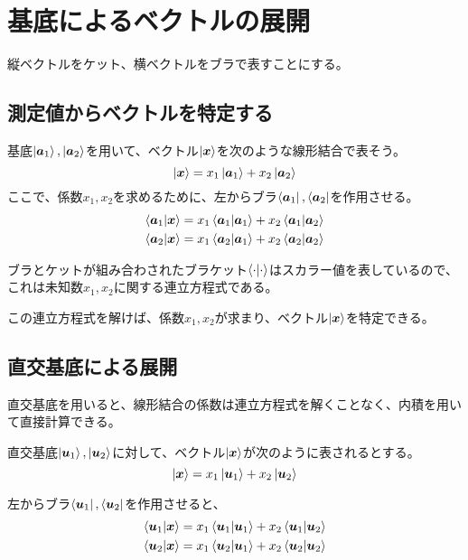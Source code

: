 \documentclass[../../../topic_linear-algebra]{subfiles}
\begin{document}
\sectionline
\section{基底によるベクトルの展開}

縦ベクトルをケット、横ベクトルをブラで表すことにする。

\subsection{測定値からベクトルを特定する}

基底$\ket{\vb*{a}_1}, \ket{\vb*{a}_2}$を用いて、ベクトル$\ket{\vb*{x}}$を次のような線形結合で表そう。
\begin{equation*}
  \ket{\vb*{x}} = x_1 \ket{\vb*{a}_1} + x_2 \ket{\vb*{a}_2}
\end{equation*}
ここで、係数$x_1, x_2$を求めるために、左からブラ$\bra{\vb*{a}_1}, \bra{\vb*{a}_2}$を作用させる。
\begin{align*}
  \braket{\vb*{a}_1|\vb*{x}} & = x_1 \braket{\vb*{a}_1|\vb*{a}_1} + x_2 \braket{\vb*{a}_1|\vb*{a}_2} \\
  \braket{\vb*{a}_2|\vb*{x}} & = x_1 \braket{\vb*{a}_2|\vb*{a}_1} + x_2 \braket{\vb*{a}_2|\vb*{a}_2} 
\end{align*}

ブラとケットが組み合わされたブラケット$\braket{\cdot|\cdot}$はスカラー値を表しているので、これは未知数$x_1, x_2$に関する連立方程式である。

この連立方程式を解けば、係数$x_1, x_2$が求まり、ベクトル$\ket{\vb*{x}}$を特定できる。

\subsection{直交基底による展開}

直交基底を用いると、線形結合の係数は連立方程式を解くことなく、内積を用いて直接計算できる。

\br

直交基底$\ket{\vb*{u}_1}, \ket{\vb*{u}_2}$に対して、ベクトル$\ket{\vb*{x}}$が次のように表されるとする。
\begin{equation*}
  \ket{\vb*{x}} = x_1 \ket{\vb*{u}_1} + x_2 \ket{\vb*{u}_2}
\end{equation*}

左からブラ$\bra{\vb*{u}_1}, \bra{\vb*{u}_2}$を作用させると、
\begin{align*}
  \braket{\vb*{u}_1|\vb*{x}} & = x_1 \braket{\vb*{u}_1|\vb*{u}_1} + x_2 \braket{\vb*{u}_1|\vb*{u}_2} \\
  \braket{\vb*{u}_2|\vb*{x}} & = x_1 \braket{\vb*{u}_2|\vb*{u}_1} + x_2 \braket{\vb*{u}_2|\vb*{u}_2}
\end{align*}
\end{document}
